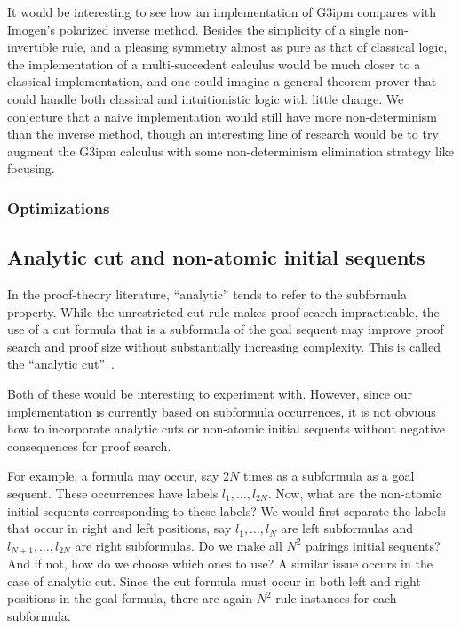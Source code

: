 It would be interesting to see how an implementation of G3ipm compares with
Imogen's polarized inverse method.  Besides the simplicity of a single
non-invertible rule, and a pleasing symmetry almost as pure as that of classical
logic, the implementation of a multi-succedent calculus would be much closer to
a classical implementation, and one could imagine a general theorem prover that
could handle both classical and intuitionistic logic with little change.  We
conjecture that a naive implementation would still have more non-determinism
than the inverse method, though an interesting line of research would be to try
augment the G3ipm calculus with some non-determinism elimination strategy like
focusing.

\subsubsection{Optimizations}

\subsection*{Analytic cut and non-atomic initial sequents}

In the proof-theory literature, ``analytic'' tends to refer to the subformula
property.  While the unrestricted cut rule makes proof search impracticable, the
use of a cut formula that is a subformula of the goal sequent may improve proof
search and proof size without substantially increasing complexity. This is
called the ``analytic cut''~\cite{Smullyan.1968.JSL}.

Both of these would be interesting to experiment with.  However, since
our implementation is currently based on subformula occurrences, it is not
obvious how to incorporate analytic cuts or non-atomic initial sequents without
negative consequences for proof search.

For example, a formula may occur, say $2N$ times as a subformula as a goal
sequent.  These occurrences have labels $l_1, \ldots, l_{2N}$.  Now, what are
the non-atomic initial sequents corresponding to these labels?  We would first
separate the labels that occur in right and left positions, say $l_1, \ldots,
l_N$ are left subformulas and $l_{N+1}, \ldots, l_{2N}$ are right subformulas.
Do we make all $N^2$ pairings initial sequents?  And if not, how do we choose
which ones to use?  A similar issue occurs in the case of analytic cut.  Since
the cut formula must occur in both left and right positions in the goal formula,
there are again $N^2$ rule instances for each subformula.

